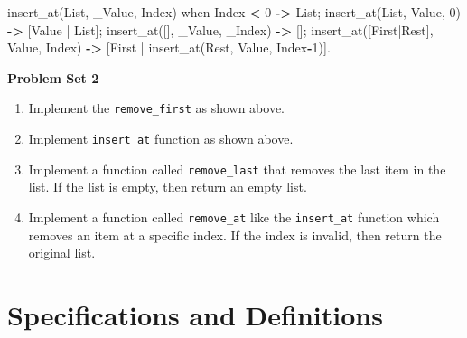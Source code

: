 \documentclass[
]{book}
\newenvironment{Shaded}{\begin{snugshade}}{\end{snugshade}}
\newcommand{\CharTok}[1]{\textcolor[rgb]{0.31,0.60,0.02}{#1}}
\newcommand{\DecValTok}[1]{\textcolor[rgb]{0.00,0.00,0.81}{#1}}
\newcommand{\FunctionTok}[1]{\textcolor[rgb]{0.00,0.00,0.00}{#1}}
\newcommand{\OperatorTok}[1]{\textcolor[rgb]{0.81,0.36,0.00}{\textbf{#1}}}
\newcommand{\VariableTok}[1]{\textcolor[rgb]{0.00,0.00,0.00}{#1}}
\providecommand{\tightlist}{%
  \setlength{\itemsep}{0pt}\setlength{\parskip}{0pt}}
\begin{document}
\begin{Shaded}
\begin{Highlighting}[]
\FunctionTok{insert\_at(}\VariableTok{List}\FunctionTok{,} \VariableTok{\_Value}\FunctionTok{,} \VariableTok{Index}\FunctionTok{)} \CharTok{when} \VariableTok{Index} \OperatorTok{\textless{}} \DecValTok{0} \OperatorTok{{-}\textgreater{}} \VariableTok{List}\FunctionTok{;}
\FunctionTok{insert\_at(}\VariableTok{List}\FunctionTok{,} \VariableTok{Value}\FunctionTok{,} \DecValTok{0}\FunctionTok{)} \OperatorTok{{-}\textgreater{}} \FunctionTok{[}\VariableTok{Value} \FunctionTok{|} \VariableTok{List}\FunctionTok{];}
\FunctionTok{insert\_at([],} \VariableTok{\_Value}\FunctionTok{,} \VariableTok{\_Index}\FunctionTok{)} \OperatorTok{{-}\textgreater{}} \FunctionTok{[];}
\FunctionTok{insert\_at([}\VariableTok{First}\FunctionTok{|}\VariableTok{Rest}\FunctionTok{],} \VariableTok{Value}\FunctionTok{,} \VariableTok{Index}\FunctionTok{)} \OperatorTok{{-}\textgreater{}} \FunctionTok{[}\VariableTok{First} \FunctionTok{|} \FunctionTok{insert\_at(}\VariableTok{Rest}\FunctionTok{,} \VariableTok{Value}\FunctionTok{,} \VariableTok{Index}\OperatorTok{{-}}\DecValTok{1}\FunctionTok{)].}
\end{Highlighting}
\end{Shaded}

\begin{problembox}

\textbf{Problem Set 2}

\begin{enumerate}
\def\labelenumi{\arabic{enumi}.}
\tightlist
\item
  Implement the \texttt{remove\_first} as shown above.
\item
  Implement \texttt{insert\_at} function as shown above.
\item
  Implement a function called \texttt{remove\_last} that removes the last item in the list. If the list is empty, then return an empty list.
\item
  Implement a function called \texttt{remove\_at} like the \texttt{insert\_at} function which removes an item at a specific index. If the index is invalid, then return the original list.
\end{enumerate}

\end{problembox}

\hypertarget{specifications-and-definitions}{%
\section{Specifications and Definitions}\label{specifications-and-definitions}}
\end{document}

